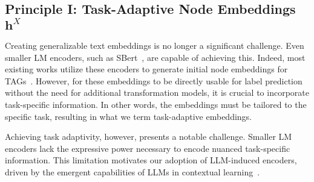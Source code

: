 


\subsection{Principle I: Task-Adaptive Node Embeddings $\mathbf{h}^X$}

Creating generalizable text embeddings is no longer a significant challenge. Even smaller LM encoders, such as SBert~\cite{reimers2019sentence}, are capable of achieving this. Indeed, most existing works utilize these encoders to generate initial node embeddings for TAGs~\cite{chen2024text,chen2024llaga, tang2024graphgpt, wang2024llms}. However, for these embeddings to be directly usable for label prediction without the need for additional transformation models, it is crucial to incorporate task-specific information. In other words, the embeddings must be tailored to the specific task, resulting in what we term task-adaptive embeddings.

Achieving task adaptivity, however, presents a notable challenge. Smaller LM encoders lack the expressive power necessary to encode nuanced task-specific information. This limitation motivates our adoption of LLM-induced encoders, driven by the emergent capabilities of LLMs in contextual learning~\cite{sahoo2024systematic, chen2023unleashing}.

